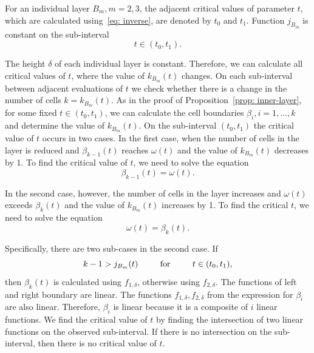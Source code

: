 For an individual layer $B_{m}, m = 2,3$, the adjacent critical values of parameter $t$, which are calculated using~\ref{eq: inverse}, are denoted by $t_{0}$ and $t_{1}$. Function $j_{B_{m}}$ is constant on the sub-interval
$$
t \in (t_{0}, t_{1}).
$$

The height $\delta$ of each individual layer is constant. Therefore, we can calculate all critical values of $t$, where the value of $k_{B_{m}}(t)$ changes. On each sub-interval between adjacent evaluations of $t$ we check whether there is a change in the number of cells $k = k_{B_{m}}(t)$. As in the proof of Proposition~\ref{prop: inner-layer}, for some fixed $t \in (t_{0}, t_{1})$, we can calculate the cell boundaries $\beta_{i}, i = 1,...,k$ and determine the value of $k_{B_{m}}(t)$. On the sub-interval $(t_{0}, t_{1})$ the critical value of $t$ occurs in two cases. In the first case, when the number of cells in the layer is reduced and $\beta_{k-1}(t)$ reaches $\omega(t)$ and the value of $k_{B_{m}}(t)$ decreases by 1. To find the critical value of $t$, we need to solve the equation
$$
\beta_{k-1}(t) = \omega(t).
$$

In the second case, however, the number of cells in the layer increases and $\omega(t)$ exceeds $\beta_{k}(t)$ and the value of $k_{B_{m}}(t)$ increases by 1. To find the critical $t$, we need to solve the equation
$$
\omega(t) = \beta_{k}(t).
$$

Specifically, there are two sub-cases in the second case. If
$$
k-1 > j_{B_{m}}(t) \text{\hspace{0.8cm}   for   \hspace{0.8cm}} t \in (t_{0}, t_{1}),
$$
then $\beta_{k}(t)$ is calculated using $f_{1,\delta}$, otherwise using $f_{2, \delta}$. The functions of left and right boundary are linear. The functions $f_{1,\delta}, f_{2,\delta}$ from the expression for $\beta_{i}$ are also linear. Therefore, $\beta_{i}$ is linear because it is a composite of $i$ linear functions. We find the critical value of $t$ by finding the intersection of two linear functions on the observed sub-interval. If there is no intersection on the sub-interval, then there is no critical value of $t$.
